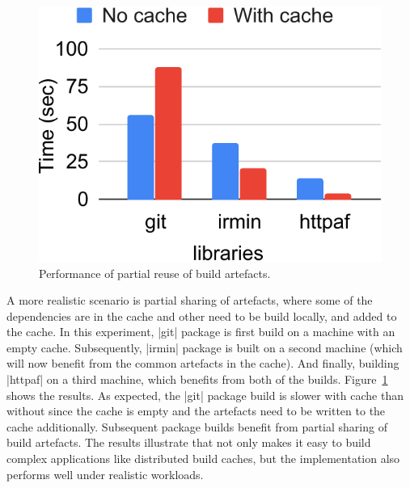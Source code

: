 \begin{figure}
	\vspace{-0.5cm}
	\centering
	\includegraphics[scale=0.5]{results/build2}
	\caption{Performance of partial reuse of build artefacts.}
	\label{res:build2}
	\vspace{-0.5cm}
\end{figure}
A more realistic scenario is partial sharing of artefacts, where some of the
dependencies are in the cache and other need to be build locally, and added to
the cache. In this experiment, |git| package is first build on a machine with
an empty cache. Subsequently, |irmin| package is built on a second machine
(which will now benefit from the common artefacts in the cache). And finally,
building |httpaf| on a third machine, which benefits from both of the builds.
Figure~\ref{res:build2} shows the results. As expected, the |git| package build
is slower with cache than without since the cache is empty and the artefacts
need to be written to the cache additionally. Subsequent package builds benefit
from partial sharing of build artefacts. The results illustrate that \name not
only makes it easy to build complex applications like distributed build caches,
but the implementation also performs well under realistic workloads.
